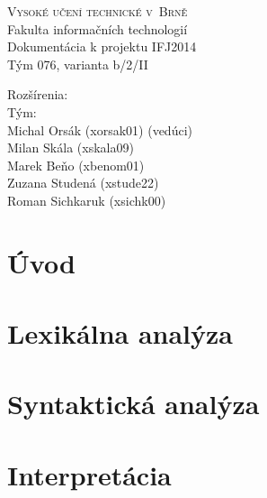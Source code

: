 \documentclass[a4paper]{article}
\begin{document}
\begin{titlepage}
\begin{center}
\textsc{\Huge{Vysoké učení technické v~Brně}}\\
\medskip
\huge{Fakulta informačních technologií}\\
\Large{Dokumentácia  k projektu IFJ2014}\\
\medskip
\Huge{Tým 076, varianta b/2/II}\\
\end{center}

\noindent
Rozšírenia:\\

Tým:\\
{\large Michal Orsák (xorsak01)  (vedúci)\\
Milan Skála (xskala09)\\ 
Marek Beňo (xbenom01)\\
Zuzana Studená (xstude22)\\
Roman Sichkaruk (xsichk00)}
\end{titlepage}

\newpage
\tableofcontents

\newpage
\section{Úvod}

\newpage
\section{Lexikálna analýza}

\newpage
\section{Syntaktická analýza}

\newpage
\section{Interpretácia}
\end{document}
